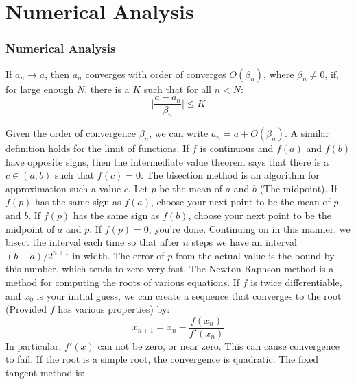\chapter{Numerical Analysis}
    \subsection{Numerical Analysis}
        \begin{definition}
            If $a_{n}\rightarrow{a}$, then $a_{n}$ converges
            with order of converges $O(\beta_{n})$, where
            $\beta_{n}\ne{0}$, if, for large enough $N$, there
            is a $K$ such that for all $n<N$:
            \begin{equation*}
                \Big|\frac{a-a_{n}}{\beta_{n}}\Big|\leq{K}
            \end{equation*}
        \end{definition}
        Given the order of convergence $\beta_{n}$, we can
        write $a_{n}=a+O(\beta_{n})$. A similar definition
        holds for the limit of functions.
        If $f$ is continuous and $f(a)$ and $f(b)$ have
        opposite signs, then the intermediate value theorem
        says that there is a $c\in(a,b)$ such that
        $f(c)=0$. The bisection method is an algorithm for
        approximation such a value $c$. Let $p$ be the
        mean of $a$ and $b$ (The midpoint). If $f(p)$ has
        the same sign as $f(a)$, choose your next point
        to be the mean of $p$ and $b$. If $f(p)$ has
        the same sign as $f(b)$, choose your next point
        to be the midpoint of $a$ and $p$. If $f(p)=0$,
        you're done. Continuing on in this manner, we bisect
        the interval each time so that after $n$ steps we
        have an interval $(b-a)/2^{n+1}$ in width. The error
        of $p$ from the actual value is the bound by this
        number, which tends to zero very fast.
        The Newton-Raphson method is a method for computing
        the roots of various equations. If $f$ is twice
        differentiable, and $x_{0}$ is your initial guess,
        we can create a sequence that converges to the
        root (Provided $f$ has various properties) by:
        \begin{equation*}
            x_{n+1}=x_{n}-\frac{f(x_{n})}{f'(x_{n})}
        \end{equation*}
        In particular, $f'(x)$ can not be zero, or near
        zero. This can cause convergence to fail.
        If the root is a simple root, the convergence
        is quadratic. The fixed tangent method is:
